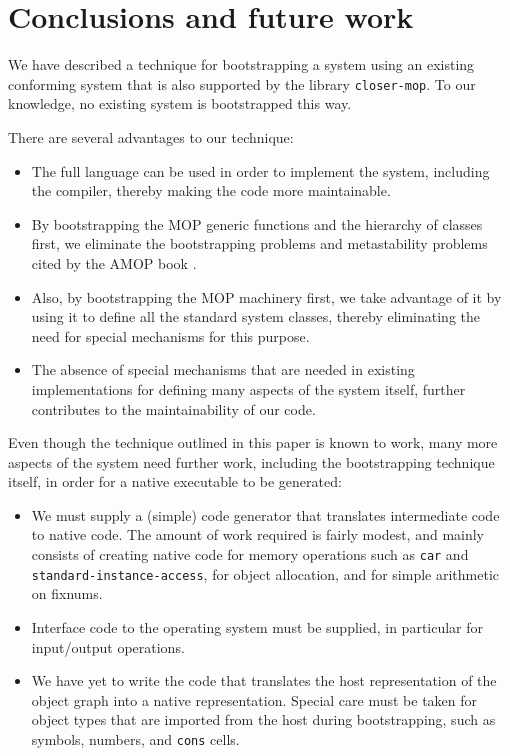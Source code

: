 \section{Conclusions and future work}

We have described a technique for bootstrapping a \commonlisp{} system
using an existing conforming \commonlisp{} system that is also
supported by the library \texttt{closer-mop}.  To our knowledge, no
existing \commonlisp{} system is bootstrapped this way.

There are several advantages to our technique:

\begin{itemize}
\item The full \commonlisp{} language can be used in order to
  implement the system, including the compiler, thereby making the
  code more maintainable.
\item By bootstrapping the MOP generic functions and the hierarchy of
  classes first, we eliminate the bootstrapping problems and
  metastability problems cited by the AMOP book
  \cite{Kiczales:1991:AMP:574212}.
\item Also, by bootstrapping the MOP machinery first, we take advantage
  of it by using it to define all the standard system classes, thereby
  eliminating the need for special mechanisms for this purpose.
\item The absence of special mechanisms that are needed in existing
  implementations for defining many aspects of the system itself,
  further contributes to the maintainability of our code.
\end{itemize}

Even though the technique outlined in this paper is known to work,
many more aspects of the system need further work, including the
bootstrapping technique itself, in order for a native executable to be
generated:

\begin{itemize}
\item We must supply a (simple) code generator that translates
  intermediate code to native code.  The amount of work required is
  fairly modest, and mainly consists of creating native code for
  memory operations such as \texttt{car} and
  \texttt{standard\--instance\--access}, for object allocation, and for
  simple arithmetic on fixnums.
\item Interface code to the operating system must be supplied, in
  particular for input/output operations.
\item We have yet to write the code that translates the host
  representation of the object graph into a native representation.
  Special care must be taken for object types that are imported from
  the host during bootstrapping, such as symbols, numbers, and
  \texttt{cons} cells.
\end{itemize}

